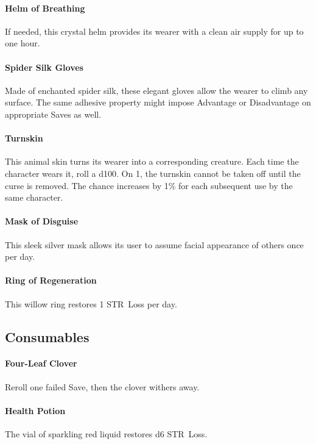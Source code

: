 \documentclass[itdr]{subfiles}
\begin{document}
\vfill
\paragraph{Helm of Breathing}
If needed, this crystal helm provides its wearer with a clean air supply  for up to one hour.

\vfill
\paragraph{Spider Silk Gloves}
Made of enchanted spider silk, these elegant gloves allow the wearer to climb any surface. The same adhesive property might impose Advantage or Disadvantage on appropriate Saves as well.

\vfill
\paragraph{Turnskin}
This animal skin turns its wearer into a corresponding creature. Each time the character wears it, roll a d100. On 1, the turnskin cannot be taken off until the curse is removed. The chance increases by 1\% for each subsequent use by the same character.

\vfill
\paragraph{Mask of Disguise}
This sleek silver mask allows its user to assume \mbox{facial} appearance of others once per day.

\vfill
\paragraph{Ring of Regeneration}
This willow ring restores 1 STR~Loss per day.

\vfill
\break

\subsection*{Consumables}

\paragraph{Four-Leaf Clover}
Reroll one failed Save, then the clover withers away.

\paragraph{Health Potion}
The vial of sparkling red liquid restores d6 STR~Loss.
\end{document}
